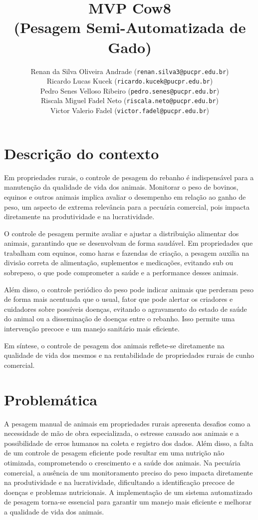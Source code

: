 \documentclass[11pt]{article}
\title{\textbf{MVP Cow8\\(Pesagem Semi-Automatizada de Gado)}}
\author{
    Renan da Silva Oliveira Andrade (\texttt{renan.silva3@pucpr.edu.br})\\
    Ricardo Lucas Kucek (\texttt{ricardo.kucek@pucpr.edu.br})\\
    Pedro Senes Velloso Ribeiro (\texttt{pedro.senes@pucpr.edu.br})\\ 
    Riscala Miguel Fadel Neto (\texttt{riscala.neto@pucpr.edu.br})\\
    Victor Valerio Fadel (\texttt{victor.fadel@pucpr.edu.br})
}
\begin{document}
\maketitle

\section{Descrição do contexto}

Em propriedades rurais, o controle de pesagem do rebanho é indispensável para a manutenção da qualidade de vida dos animais. Monitorar o peso de bovinos, equinos e outros animais implica avaliar o desempenho em relação ao ganho de peso, um aspecto de extrema relevância para a pecuária comercial, pois impacta diretamente na produtividade e na lucratividade.

O controle de pesagem permite avaliar e ajustar a distribuição alimentar dos animais, garantindo que se desenvolvam de forma saudável. Em propriedades que trabalham com equinos, como haras e fazendas de criação, a pesagem auxilia na divisão correta de alimentação, suplementos e medicações, evitando sub ou sobrepeso, o que pode comprometer a saúde e a performance desses animais.

Além disso, o controle periódico do peso pode indicar animais que perderam peso de forma mais acentuada que o usual, fator que pode alertar os criadores e cuidadores sobre possíveis doenças, evitando o agravamento do estado de saúde do animal ou a disseminação de doenças entre o rebanho. Isso permite uma intervenção precoce e um manejo sanitário mais eficiente.

Em síntese, o controle de pesagem dos animais reflete-se diretamente na qualidade de vida dos mesmos e na rentabilidade de propriedades rurais de cunho comercial.

\section{Problemática}
A pesagem manual de animais em propriedades rurais apresenta desafios como a necessidade de mão de obra especializada, o estresse causado aos animais e a possibilidade de erros humanos na coleta e registro dos dados. Além disso, a falta de um controle de pesagem eficiente pode resultar em uma nutrição não otimizada, comprometendo o crescimento e a saúde dos animais. Na pecuária comercial, a ausência de um monitoramento preciso do peso impacta diretamente na produtividade e na lucratividade, dificultando a identificação precoce de doenças e problemas nutricionais. A implementação de um sistema automatizado de pesagem torna-se essencial para garantir um manejo mais eficiente e melhorar a qualidade de vida dos animais.
\end{document}

